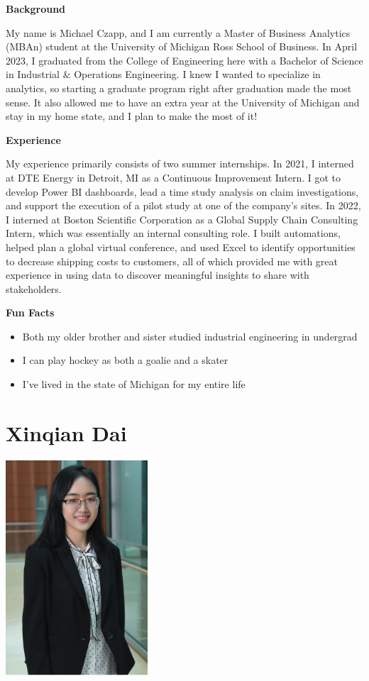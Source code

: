 \documentclass[
]{book}
\begin{document}
\textbf{Background}

My name is Michael Czapp, and I am currently a Master of Business Analytics (MBAn) student at the University of Michigan Ross School of Business. In April 2023, I graduated from the College of Engineering here with a Bachelor of Science in Industrial \& Operations Engineering. I knew I wanted to specialize in analytics, so starting a graduate program right after graduation made the most sense. It also allowed me to have an extra year at the University of Michigan and stay in my home state, and I plan to make the most of it!

\textbf{Experience}

My experience primarily consists of two summer internships. In 2021, I interned at DTE Energy in Detroit, MI as a Continuous Improvement Intern. I got to develop Power BI dashboards, lead a time study analysis on claim investigations, and support the execution of a pilot study at one of the company's sites. In 2022, I interned at Boston Scientific Corporation as a Global Supply Chain Consulting Intern, which was essentially an internal consulting role. I built automations, helped plan a global virtual conference, and used Excel to identify opportunities to decrease shipping costs to customers, all of which provided me with great experience in using data to discover meaningful insights to share with stakeholders.

\textbf{Fun Facts}

\begin{itemize}
\item
  Both my older brother and sister studied industrial engineering in undergrad
\item
  I can play hockey as both a goalie and a skater
\item
  I've lived in the state of Michigan for my entire life
\end{itemize}

\hypertarget{xinqian-dai}{%
\section{Xinqian Dai}\label{xinqian-dai}}

\includegraphics[width=2.08333in,height=\textheight]{Demi Photo.png}
\end{document}
